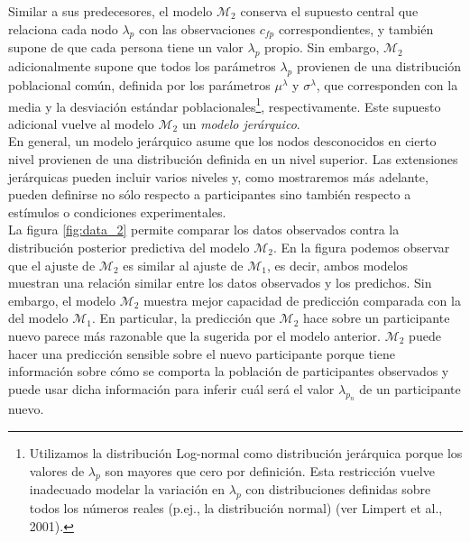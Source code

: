 \documentclass{article}
\begin{document}
\indent Similar a sus predecesores, el modelo $\mathcal M_2$ conserva el supuesto central que relaciona cada nodo $\lambda_p$ con las observaciones $c_{fp}$ correspondientes, y también supone de que cada persona tiene un valor $\lambda_p$ propio. Sin embargo, $\mathcal M_2$ adicionalmente supone que todos los parámetros $\lambda_p$ provienen de una distribución poblacional común, definida por los parámetros $\mu^\lambda$ y $\sigma^\lambda$, que corresponden con la media y la desviación estándar poblacionales\footnote{Utilizamos la distribución Log-normal como distribución jerárquica porque los valores de $\lambda_p$ son mayores que cero por definición. Esta restricción vuelve inadecuado modelar la variación en $\lambda_p$ con distribuciones definidas sobre todos los números reales (p.ej., la distribución normal) (ver Limpert et al., 2001).}, respectivamente. Este supuesto adicional vuelve al modelo $\mathcal M_2$ un \emph{modelo jerárquico}.\\
\indent En general, un modelo jerárquico asume que los nodos desconocidos en cierto nivel provienen de una distribución definida en un nivel superior. Las extensiones jerárquicas pueden incluir varios niveles y, como mostraremos más adelante, pueden definirse no sólo respecto a participantes sino también respecto a estímulos o condiciones experimentales.\\
\indent La figura \ref{fig:data_2} permite comparar los datos observados contra la distribución posterior predictiva del modelo $\mathcal M_2$. En la figura podemos observar que el ajuste de $\mathcal M_2$ es similar al ajuste de $\mathcal M_1$, es decir, ambos modelos muestran una relación similar entre los datos observados y los predichos. Sin embargo, el modelo $\mathcal M_2$ muestra mejor capacidad de predicción comparada con la del modelo $\mathcal M_1$. En particular, la predicción que $\mathcal M_2$ hace sobre un participante nuevo parece más razonable que la sugerida por el modelo anterior. $\mathcal M_2$ puede hacer una predicción sensible sobre el nuevo participante porque tiene información sobre cómo se comporta la población de participantes observados y puede usar dicha información para inferir cuál será el valor $\lambda_{p_{n}}$ de un participante nuevo.
\end{document}

